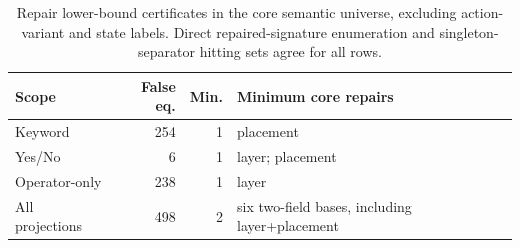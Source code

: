 \begin{table}[t]
\centering
\caption{Repair lower-bound certificates in the core semantic universe, excluding action-variant and state labels. Direct repaired-signature enumeration and singleton-separator hitting sets agree for all rows.}
\label{tab:repair-lower-bound}
\small
\begin{tabular}{lrrp{}}
\toprule
Scope & False eq. & Min. & Minimum core repairs \\
\midrule
Keyword & 254 & 1 & placement \\
Yes/No & 6 & 1 & layer; placement \\
Operator-only & 238 & 1 & layer \\
All projections & 498 & 2 & six two-field bases, including layer+placement \\
\bottomrule
\end{tabular}
\end{table}
